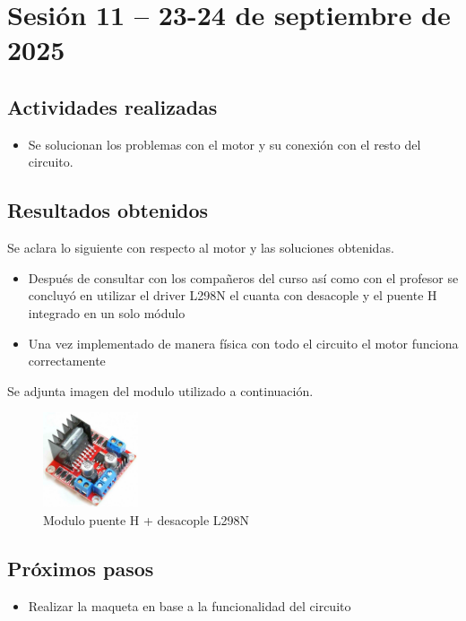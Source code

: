 \documentclass[12pt,letterpaper]{article}
\begin{document}
\section{Sesión 11 -- 23-24 de septiembre de 2025}
\subsection*{Actividades realizadas}
\begin{itemize}
    \item Se solucionan los problemas con el motor y su conexión con el resto del circuito.
\end{itemize}

\subsection*{Resultados obtenidos}
Se aclara lo siguiente con respecto al motor y las soluciones obtenidas.
\begin{itemize}
    \item Después de consultar con los compañeros del curso así como con el profesor se concluyó en utilizar el driver L298N el cuanta con desacople y el puente H integrado en un solo módulo
    \item Una vez implementado de manera física con todo el circuito el motor funciona correctamente
\end{itemize}
Se adjunta imagen del modulo utilizado a continuación.
\begin{figure}[H]
    \centering
    \includegraphics[width=0.25\textwidth]{images/L298N.png} %
    \caption{Modulo puente H + desacople L298N}
    \label{fig:L298N}
\end{figure}

\subsection*{Próximos pasos}
\begin{itemize}
    \item Realizar la maqueta en base a la funcionalidad del circuito
\end{itemize}
\end{document}
